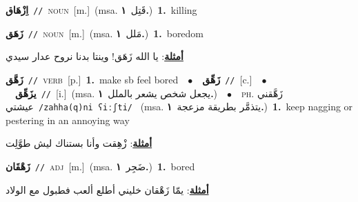 \documentclass[10pt,a4paper,twoside]{article} %
\begin{document}
\begin{multicols}{2}
{\setlength\topsep{0pt}\textbf{\foreignlanguage{arabic}{اِزْهَاق}}\ {\color{gray}\texttt{//}\color{black}}\ \textsc{noun}\ [m.]\ \color{gray}(msa. \foreignlanguage{arabic}{قَتِل}~\foreignlanguage{arabic}{\textbf{١.}})\color{black}\ \textbf{1.}~killing\ } \vspace{2mm}

{\setlength\topsep{0pt}\textbf{\foreignlanguage{arabic}{زَهَق}}\ {\color{gray}\texttt{//}\color{black}}\ \textsc{noun}\ [m.]\ \color{gray}(msa. \foreignlanguage{arabic}{مَلل}~\foreignlanguage{arabic}{\textbf{١.}})\color{black}\ \textbf{1.}~boredom\  \begin{flushright}\color{gray}\foreignlanguage{arabic}{\textbf{\underline{\foreignlanguage{arabic}{أمثلة}}}: يا الله زَهَق! وينتا بدنا نروح عدار سيدي}\end{flushright}\color{black}} \vspace{2mm}

{\setlength\topsep{0pt}\textbf{\foreignlanguage{arabic}{زَهَّق}}\ {\color{gray}\texttt{//}\color{black}}\ \textsc{verb}\ [p.]\ \textbf{1.}~make sb feel bored\ \ $\bullet$\ \ \setlength\topsep{0pt}\textbf{\foreignlanguage{arabic}{زَهِّق}}\ {\color{gray}\texttt{//}\color{black}}\ [c.]\ \ $\bullet$\ \ \setlength\topsep{0pt}\textbf{\foreignlanguage{arabic}{يزَهِّق}}\ {\color{gray}\texttt{//}\color{black}}\ [i.]\ \color{gray}(msa. \foreignlanguage{arabic}{يجعل شخص يشعر بالملل}~\foreignlanguage{arabic}{\textbf{١.}})\color{black}\ \ $\bullet$\ \ \textsc{ph.} \color{gray} \foreignlanguage{arabic}{زَهَّقني عيشتي}\color{black}\ {\color{gray}\texttt{/{\sffamily zahha(q)ni ʕiːʃti}/}\color{black}}\ \color{gray} (msa. \foreignlanguage{arabic}{يتذمَّر بطريقة مزعجة}~\foreignlanguage{arabic}{\textbf{١.}})\color{black}\ \textbf{1.}~keep nagging or pestering in an annoying way\  \begin{flushright}\color{gray}\foreignlanguage{arabic}{\textbf{\underline{\foreignlanguage{arabic}{أمثلة}}}: زْهِقت وأنا بستناك ليش طوَّلِت}\end{flushright}\color{black}} \vspace{2mm}

{\setlength\topsep{0pt}\textbf{\foreignlanguage{arabic}{زَهْقَان}}\ {\color{gray}\texttt{//}\color{black}}\ \textsc{adj}\ [m.]\ \color{gray}(msa. \foreignlanguage{arabic}{ضَجِر}~\foreignlanguage{arabic}{\textbf{١.}})\color{black}\ \textbf{1.}~bored\  \begin{flushright}\color{gray}\foreignlanguage{arabic}{\textbf{\underline{\foreignlanguage{arabic}{أمثلة}}}: يمّا زَهْقان خليني أطلع ألعب فطبول مع الولاد}\end{flushright}\color{black}} \vspace{2mm}


\end{multicols}
\end{document}
